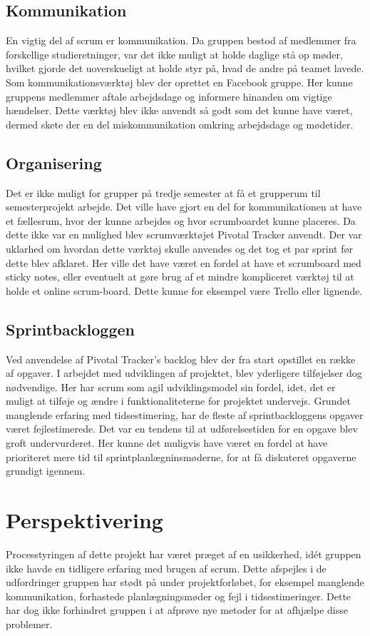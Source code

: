 \section{Kommunikation}
En vigtig del af scrum er kommunikation. Da gruppen bestod af medlemmer fra forskellige studieretninger, var det ikke muligt at holde daglige stå op møder, hvilket gjorde det uoverskueligt at holde styr på, hvad de andre på teamet lavede. Som kommunikationsværktøj blev der oprettet en Facebook gruppe. Her kunne gruppens medlemmer aftale arbejdsdage og informere hinanden om vigtige hændelser. Dette værktøj blev ikke anvendt så godt som det kunne have været, dermed skete der en del miskommunikation omkring arbejdsdage og mødetider. \newline

\section{Organisering}
Det er ikke muligt for grupper på tredje semester at få et grupperum til semesterprojekt arbejde. Det ville have gjort en del for kommunikationen at have et fællesrum, hvor der kunne arbejdes og hvor scrumboardet kunne placeres. Da dette ikke var en mulighed blev scrumværktøjet Pivotal Tracker anvendt. Der var uklarhed om hvordan dette værktøj skulle anvendes og det tog et par sprint før dette blev afklaret. Her ville det have været en fordel at have et scrumboard med sticky notes, eller eventuelt at gøre brug af et mindre kompliceret værktøj til at holde et online scrum-board. Dette kunne for eksempel være Trello \cite{trello} eller lignende. 

\section{Sprintbackloggen}
Ved anvendelse af Pivotal Tracker's backlog blev der fra start opstillet en række af opgaver. I arbejdet med udviklingen af projektet, blev yderligere tilføjelser dog nødvendige. Her har scrum som agil udviklingsmodel sin fordel, idet, det er muligt at tilføje og ændre i funktionaliteterne for projektet undervejs. 
Grundet manglende erfaring med tidsestimering, har de fleste af sprintbackloggens opgaver været fejlestimerede. Det var en tendens til at udførelsestiden for en opgave blev groft undervurderet. Her kunne det muligvis have været en fordel at have prioriteret mere tid til sprintplanlægninsmøderne, for at få diskuteret opgaverne grundigt igennem. 


\chapter{Perspektivering}
Processtyringen af dette projekt har været præget af en usikkerhed, idét gruppen ikke havde en tidligere erfaring med brugen af scrum. Dette afspejles i de udfordringer gruppen har stødt på under projektforløbet, for eksempel manglende kommunikation, forhastede planlægningsmøder og fejl i tidsestimeringer. Dette har dog ikke forhindret gruppen i at afprøve nye metoder for at afhjælpe disse problemer. \newline

